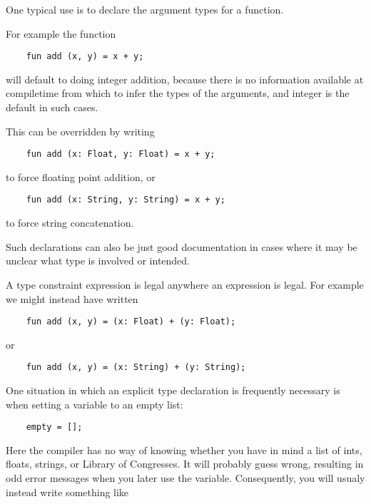 One typical use is to declare the argument types for a function.

For example the function

\begin{verbatim}
    fun add (x, y) = x + y;
\end{verbatim}

will default to doing integer addition, because there is no 
information available at compiletime from which to infer the 
types of the arguments, and integer is the default in such 
cases.

This can be overridden by writing

\begin{verbatim}
    fun add (x: Float, y: Float) = x + y;
\end{verbatim}

to force floating point addition, or

\begin{verbatim}
    fun add (x: String, y: String) = x + y;
\end{verbatim}

to force string concatenation.

Such declarations can also be just good documentation in cases 
where it may be unclear what type is involved or intended.

A type constraint expression is legal anywhere an expression is 
legal.  For example we might instead have written

\begin{verbatim}
    fun add (x, y) = (x: Float) + (y: Float);
\end{verbatim}

or

\begin{verbatim}
    fun add (x, y) = (x: String) + (y: String);
\end{verbatim}

One situation in which an explicit type declaration is frequently 
necessary is when setting a variable to an empty list:

\begin{verbatim}
    empty = [];
\end{verbatim}

Here the compiler has no way of knowing whether you have in mind 
a list of ints, floats, strings, or Library of Congresses.  It will 
probably guess wrong, resulting in odd error messages when you 
later use the variable.  Consequently, you will usualy instead write 
something like

